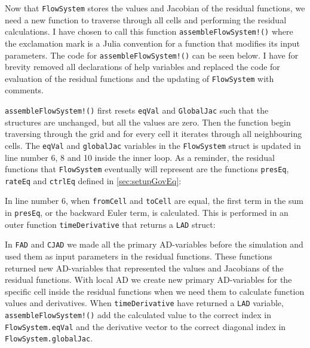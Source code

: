 Now that \texttt{FlowSystem} stores the  values and Jacobian of the residual functions, we need a new function to traverse through all cells and performing the residual calculations. I have chosen to call this function \texttt{assembleFlowSystem!()} where the exclamation mark is a Julia convention for a function that modifies its input parameters. The code for \texttt{assembleFlowSystem!()} can be seen below. I have for brevity removed all declarations of help variables and replaced the code for evaluation of the residual functions and the updating of \texttt{FlowSystem} with comments.
\lstset{numbers=left}

\lstset{numbers=none}
\texttt{assembleFlowSystem!()} first resets \texttt{eqVal} and \texttt{GlobalJac} such that the structures are unchanged, but all the values are zero. Then the function begin traversing through the grid and for every cell it iterates through all neighbouring cells. The \texttt{eqVal} and \texttt{globalJac} variables in the \texttt{FlowSystem} struct is updated in line number 6, 8 and 10 inside the inner loop. As a reminder, the residual functions that \texttt{FlowSystem} eventually will represent are the functions \texttt{presEq}, \texttt{rateEq} and \texttt{ctrlEq} defined in \autoref{sec:setupGovEq}:



In line number 6, when \texttt{fromCell} and \texttt{toCell} are equal, the first term in the sum in \texttt{presEq}, or the backward Euler term, is calculated. This is performed in an outer function \texttt{timeDerivative} that returns a \texttt{LAD} struct:

In \texttt{FAD} and \texttt{CJAD} we made all the primary AD-variables before the simulation and used them as input parameters in the residual functions. These functions returned new AD-variables that represented the values and Jacobians of the residual functions. With local AD we create new primary AD-variables for the specific cell inside the residual functions when we need them to calculate function values and derivatives. When \texttt{timeDerivative} have returned a \texttt{LAD} variable, \texttt{assembleFlowSystem!()} add the calculated value to the correct index in \texttt{FlowSystem.eqVal} and the derivative vector to the correct diagonal index in \texttt{FlowSystem.globalJac}.

